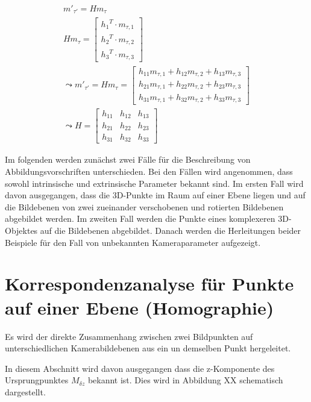\begin{gather}
m'_{\tau'} = Hm_{\tau}\\
Hm_{\tau} = \begin{bmatrix}
{h_1}^T \cdot m_{\tau,1}\\{h_2}^T \cdot m_{\tau,2}\\{h_3}^T \cdot m_{\tau,3}
\end{bmatrix} \\
\leadsto 
m'_{\tau'}= Hm_{\tau}= \begin{bmatrix}
h_{11}m_{\tau,1}+h_{12}m_{\tau,2}+h_{13}m_{\tau,3}\\
h_{21}m_{\tau,1}+h_{22}m_{\tau,2}+h_{23}m_{\tau,3}\\
h_{31}m_{\tau,1}+h_{32}m_{\tau,2}+h_{33}m_{\tau,3}
\end{bmatrix}\\
\leadsto 
H=\begin{bmatrix}
h_{11}&h_{12}&h_{13}\\
h_{21}&h_{22}&h_{23}\\
h_{31}&h_{32}&h_{33}
\end{bmatrix}
\end{gather}

Im folgenden werden zunächst zwei Fälle für die Beschreibung von Abbildungsvorschriften unterschieden. Bei den Fällen wird angenommen, dass sowohl intrinsische und extrinsische Parameter bekannt sind. Im ersten Fall wird davon ausgegangen, dass die 3D-Punkte im Raum auf einer Ebene liegen und auf die Bildebenen von zwei zueinander verschobenen und rotierten Bildebenen abgebildet werden. Im zweiten Fall werden die Punkte eines komplexeren 3D-Objektes auf die Bildebenen abgebildet. Danach werden die Herleitungen beider Beispiele für den Fall von unbekannten Kameraparameter aufgezeigt. 



 
 \section{Korrespondenzanalyse für Punkte auf einer Ebene (Homographie)}
 
 Es wird der direkte Zusammenhang zwischen zwei Bildpunkten auf unterschiedlichen Kamerabildebenen aus ein un demselben Punkt hergeleitet. 

 
  In diesem Abschnitt wird davon ausgegangen dass die z-Komponente des Ursprungpunktes $M_{\delta z}$ bekannt ist. Dies wird in Abbildung XX schematisch dargestellt.
 
